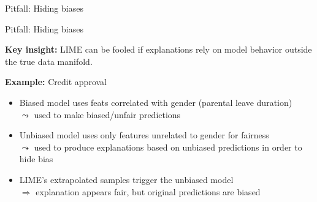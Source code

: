 \documentclass[10pt,compress,t,notes=noshow, xcolor=table]{beamer}
\begin{document}
\begin{frame}{Pitfall: Hiding biases }
\end{frame}



\begin{frame}{Pitfall: Hiding biases }

\textbf{Key insight:} LIME can be fooled if explanations rely on model behavior outside the true data manifold.

\lz
   
\textbf{Example:} Credit approval
  \begin{itemize}
    \item Biased model uses feats correlated with gender (parental leave duration)\\
    $\leadsto$ used to make biased/unfair predictions
    \item Unbiased model uses only features unrelated to gender for fairness\\%
    $\leadsto$ used to produce explanations based on unbiased predictions in order to hide bias
    \item LIME’s extrapolated samples trigger the unbiased model\\
    $\Rightarrow$ explanation appears fair, but original predictions are biased
  \end{itemize}

\end{frame}
\end{document}
